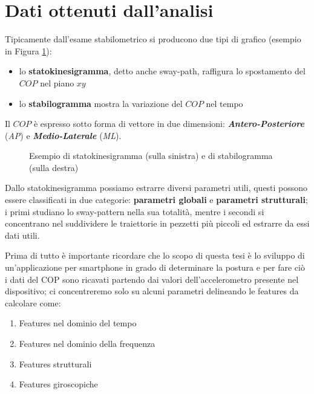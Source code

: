 \section{Dati ottenuti dall'analisi}
Tipicamente dall'esame stabilometrico si producono due tipi di grafico (esempio in Figura \ref{fig:statokinesigramma}):
\begin{itemize}    
    \item lo {\bfseries statokinesigramma}, detto anche sway-path, raffigura lo spostamento del $COP$ nel piano $xy$
    \item lo {\bfseries stabilogramma} mostra la variazione del $COP$ nel tempo
\end{itemize}

Il $COP$ è espresso sotto forma di vettore in due dimensioni: {\bfseries\itshape Antero-Posteriore} ({\itshape AP}) e {\bfseries\itshape Medio-Laterale} ({\itshape ML}).

\begin{figure}[!htb]
    \caption{\label{fig:statokinesigramma} Esempio di statokinesigramma (sulla sinistra) e di stabilogramma (sulla destra)}
\end{figure}

Dallo statokinesigramma possiamo estrarre diversi parametri utili, questi possono essere classificati in due categorie: {\bfseries parametri globali} e {\bfseries parametri strutturali}; i primi studiano lo sway-pattern nella sua totalità, mentre i secondi si concentrano nel suddividere le traiettorie in pezzetti più piccoli ed estrarre da essi dati utili.

Prima di tutto è importante ricordare che lo scopo di questa tesi è lo sviluppo di un'applicazione per smartphone in grado di determinare la postura e per fare ciò i dati del COP sono ricavati partendo dai valori dell'accelerometro presente nel dispositivo; ci concentreremo solo su alcuni parametri delineando le features da calcolare come:
\begin{enumerate}
    \item Features nel dominio del tempo
    \item Features nel dominio della frequenza
    \item Features strutturali
    \item Features giroscopiche
\end{enumerate}

